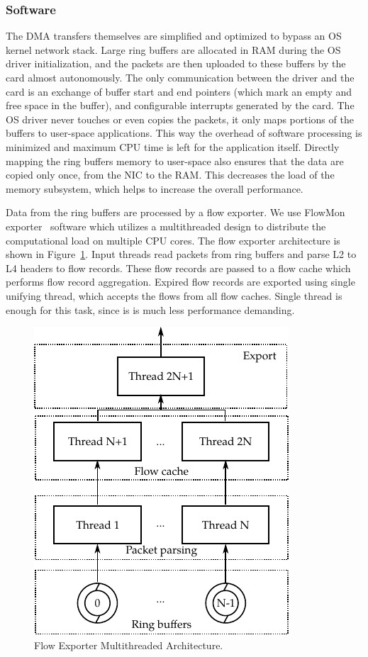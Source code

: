 \subsubsection{Software}

The DMA transfers themselves are simplified and optimized to bypass an OS kernel network stack. Large ring buffers are allocated in RAM during the OS driver initialization, and the packets are then uploaded to these buffers by the card almost autonomously. The only communication between the driver and the card is an exchange of buffer start and end pointers (which mark an empty and free space in the buffer), and configurable interrupts generated by the card. The OS driver never touches or even copies the packets, it only maps portions of the buffers to user-space applications. This way the overhead of software processing is minimized and maximum CPU time is left for the application itself. Directly mapping the ring buffers memory to user-space also ensures that the data are copied only once, from the NIC to the RAM. This decreases the load of the memory subsystem, which helps to increase the overall performance.

Data from the ring buffers are processed by a flow exporter. We use FlowMon exporter~\cite{FlowmonNetworks--Flowmon} software which utilizes a multithreaded design to distribute the computational load on multiple CPU cores. The flow exporter architecture is shown in Figure~\ref{fig:exporter}. Input threads read packets from ring buffers and parse L2 to L4 headers to flow records. These flow records are passed to a flow cache which performs flow record aggregation. Expired flow records are exported using single unifying thread, which accepts the flows from all flow caches. Single thread is enough for this task, since is is much less performance demanding.

\begin{figure}[t]
    \centering 
    \includegraphics{figures/paper-highdensity/fig/exporter}
    \caption{Flow Exporter Multithreaded Architecture.}
    \label{fig:exporter}
\end{figure}

